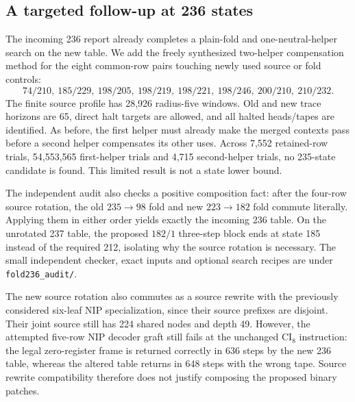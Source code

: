 \subsection{A targeted follow-up at 236 states}

The incoming 236 report already completes a plain-fold and one-neutral-helper
search on the new table. We add the freely synthesized two-helper
compensation method for the eight common-row pairs touching newly used
source or fold controls:
\[
 74/210,\ 185/229,\ 198/205,\ 198/219,\ 198/221,\ 198/246,
 \ 200/210,\ 210/232.
\]
The finite source profile has 28,926 radius-five windows. Old and new trace
horizons are 65, direct halt targets are allowed, and all halted heads/tapes
are identified. As before, the first helper must already make the merged
contexts pass before a second helper compensates its other uses. Across
7,552 retained-row trials, 54,553,565 first-helper trials and 4,715
second-helper trials, no 235-state candidate is found. This limited result
is not a state lower bound.

The independent audit also checks a positive composition fact: after the
four-row source rotation, the old $235\to98$ fold and new $223\to182$ fold
commute literally. Applying them in either order yields exactly the incoming
236 table. On the unrotated 237 table, the proposed $182/1$ three-step block
ends at state 185 instead of the required 212, isolating why the source
rotation is necessary. The small independent checker, exact inputs and
optional search recipes are under \texttt{fold236\_audit/}.

The new source rotation also commutes as a source rewrite with the previously
considered six-leaf NIP specialization, since their source prefixes are
disjoint. Their joint source still has 224 shared nodes and depth 49.
However, the attempted five-row NIP decoder graft still fails at the
unchanged $\mathrm{CI}_8$ instruction: the legal zero-register frame is
returned correctly in 636 steps by the new 236 table, whereas the altered
table returns in 648 steps with the wrong tape. Source rewrite compatibility
therefore does not justify composing the proposed binary patches.

